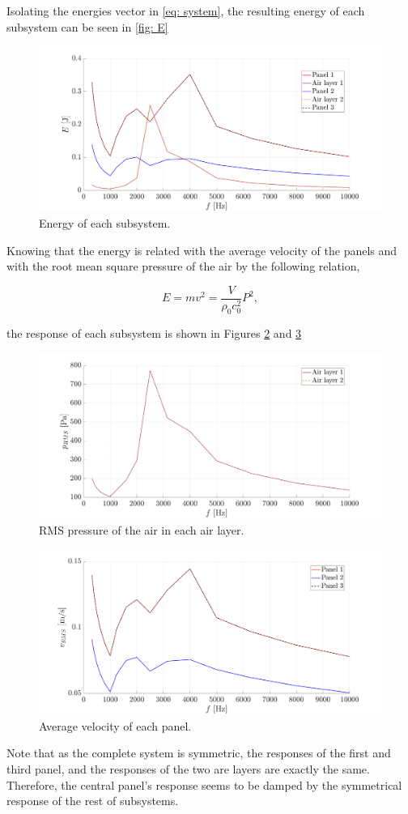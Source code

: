 Isolating the energies vector in \autoref{eq: system}, the resulting energy of each subsystem can be seen in \autoref{fig: E}

\begin{figure}[H]
    \centering
    \includegraphics[width=0.75\linewidth]{Figures/E.png}
    \caption{Energy of each subsystem.}
    \label{fig: E}
\end{figure}

Knowing that the energy is related with the average velocity of the panels and with the root mean square pressure of the air  by the following relation,

\begin{equation}
    E = m v^2 = \frac{V}{\rho_0 c_0^2} P^2,
\end{equation}

the response of each subsystem is shown in Figures \ref{fig: pRMS} and \ref{fig: vRMS}
\begin{figure}[H]
    \centering
    \includegraphics[width=0.75\linewidth]{Figures/pRMS.png}
    \caption{RMS pressure of the air in each air layer.}
    \label{fig: pRMS}
\end{figure}
\begin{figure}[H]
    \centering
    \includegraphics[width=0.75\linewidth]{Figures/vRMS.png}
    \caption{Average velocity of each panel.}
    \label{fig: vRMS}
\end{figure}

Note that as the complete system is symmetric, the responses of the first and third panel, and the responses of the two are layers are exactly the same. Therefore, the central panel's response seems to be damped by the symmetrical response of the rest of subsystems. 
